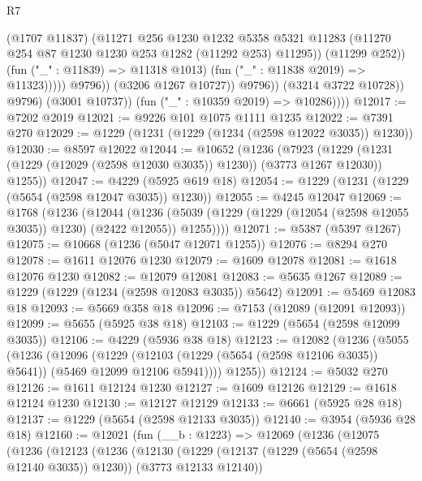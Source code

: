 \begin{lexlean}{R7}
\begin{coremodule}
                                    (@1707 @11837)
                                    (@11271
                                      @256
                                      @1230
                                      @1232
                                      @5358
                                      @5321
                                      @11283
                                      (@11270 @254 @87 @1230 @1230 @253 @1282 (@11292 @253) @11295))
                                    (@11299 @252))
                                  (fun ("_" : @11839) => @11318 @1013)
                                  (fun ("_" : @11838 @2019) => @11323)))))
                          @9796))
                      (@3206 @1267 @10727))
                    @9796))
                (@3214 @3722 @10728))
              @9796)
            (@3001 @10737))
          (fun ("_" : @10359 @2019) => @10286))))
@12017 := @7202 @2019
@12021 := @9226 @101 @1075 @1111 @1235
@12022 := @7391 @270
@12029 := @1229 (@1231 (@1229 (@1234 (@2598 @12022 @3035)) @1230))
@12030 := @8597 @12022
@12044 := @10652
    (@1236
      (@7923
        (@1229 (@1231 (@1229 (@12029 (@2598 @12030 @3035)) @1230)) (@3773 @1267 @12030))
        @1255))
@12047 := @4229 (@5925 @619 @18)
@12054 := @1229 (@1231 (@1229 (@5654 (@2598 @12047 @3035)) @1230))
@12055 := @4245 @12047
@12069 := @1768
    (@1236
      (@12044
        (@1236 (@5039 (@1229 (@1229 (@12054 (@2598 @12055 @3035)) @1230) (@2422 @12055)) @1255))))
@12071 := @5387 (@5397 @1267)
@12075 := @10668 (@1236 (@5047 @12071 @1255))
@12076 := @8294 @270
@12078 := @1611 @12076 @1230
@12079 := @1609 @12078
@12081 := @1618 @12076 @1230
@12082 := @12079 @12081
@12083 := @5635 @1267
@12089 := @1229 (@1229 (@1234 (@2598 @12083 @3035)) @5642)
@12091 := @5469 @12083 @18
@12093 := @5669 @358 @18
@12096 := @7153 (@12089 (@12091 @12093))
@12099 := @5655 (@5925 @38 @18)
@12103 := @1229 (@5654 (@2598 @12099 @3035))
@12106 := @4229 (@5936 @38 @18)
@12123 := @12082
    (@1236
      (@5055
        (@1236
          (@12096
            (@1229
              (@12103 (@1229 (@5654 (@2598 @12106 @3035)) @5641))
              (@5469 @12099 @12106 @5941))))
        @1255))
@12124 := @5032 @270
@12126 := @1611 @12124 @1230
@12127 := @1609 @12126
@12129 := @1618 @12124 @1230
@12130 := @12127 @12129
@12133 := @6661 (@5925 @28 @18)
@12137 := @1229 (@5654 (@2598 @12133 @3035))
@12140 := @3954 (@5936 @28 @18)
@12160 := @12021
    (fun (__b : @1223) =>
    @12069
      (@1236
        (@12075
          (@1236
            (@12123
              (@1236
                (@12130
                  (@1229 (@12137 (@1229 (@5654 (@2598 @12140 @3035)) @1230)) (@3773 @12133 @12140))

\end{coremodule}
\end{lexlean}
